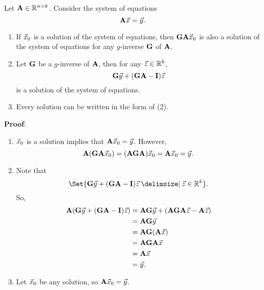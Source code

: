 \begin{Theorem}{}{}
    Let $ \mathbf{A}\in\mathbb{R}^{n\times k} $. Consider the system of equations
    \[ \mathbf{A}\vec{x}=\vec{y}. \]
    \begin{enumerate}[(1)]
        \item If $ \vec{x}_0 $ is a solution of the system of equations, then
              $ \mathbf{G}\mathbf{A}\vec{x}_0 $ is also a solution of the system of equations for any $ g $-inverse
              $ \mathbf{G} $ of $ \mathbf{A} $.
        \item Let $ \mathbf{G} $ be a $ g $-inverse of $\mathbf{A}$, then for any $ \vec{z}\in\mathbb{R}^{k} $,
              \[ \mathbf{G}\vec{y}+(\mathbf{G}\mathbf{A}-\mathbf{I})\vec{z} \]
              is a solution of the system of equations.
        \item Every solution can be written in the form of (2).
    \end{enumerate}
    \tcblower{}
    \textbf{Proof}:
    \begin{enumerate}[(1)]
        \item $ \vec{x}_0 $ is a solution implies that $ \mathbf{A}\vec{x}_0=\vec{y} $. However,
              \[ \mathbf{A}(\mathbf{G}\mathbf{A}\vec{x}_0)=(\mathbf{AGA})\vec{x}_0 =\mathbf{A}\vec{x}_0 =\vec{y}. \]
        \item Note that
              \[ \Set{ \Matrix{G}\Vector{y}+(\Matrix{G}\Matrix{A}-\Matrix{I})\Vector{z}\given \Vector{z}\in\R^k}. \]
              So,
              \begin{align*}
                  \mathbf{A}(\mathbf{G}\vec{y}+(\mathbf{G}\mathbf{A}-\mathbf{I})\vec{z})
                   & =\mathbf{AG}\vec{y}+(\mathbf{AGA}\vec{z}-\mathbf{A}\vec{z}) \\
                   & =\mathbf{AG}\vec{y}                                               \\
                   & =\mathbf{AG}(\mathbf{A}\vec{x})                                   \\
                   & =\mathbf{AGA}\vec{x}                                              \\
                   & =\mathbf{A}\vec{x}                                                \\
                   & =\vec{y}.
              \end{align*}
        \item Let $ \vec{x}_0 $ be any solution, so $ \mathbf{A}\vec{x}_0=\vec{y} $.

\end{enumerate}
\end{Theorem}
